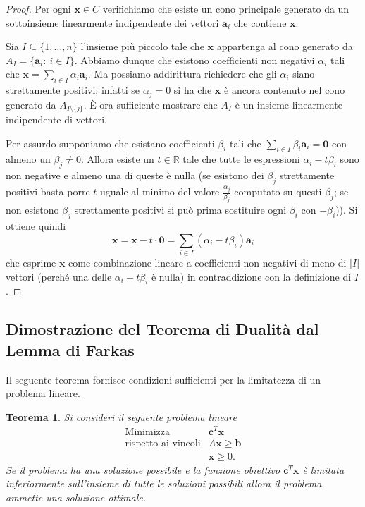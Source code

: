 \documentclass[italian, letter paper, 12pt, reqno]{article}
\theoremstyle{myteo}
\newtheorem{theorem}{Teorema}[section]
\numberwithin{equation}{section}
\begin{document}
\begin{proof}
  Per ogni \(\mathbf{x}\in C\) verifichiamo che esiste un cono principale generato da un sottoinsieme linearmente indipendente dei vettori \(\mathbf{a}_i\) che contiene \(\mathbf{x}\).

  Sia \(I\subseteq\{1,\ldots, n\}\) l'insieme più piccolo tale che \(\mathbf{x}\) appartenga al cono generato da \(A_I=\{\mathbf{a}_i\colon\ i\in I\}\).
  Abbiamo dunque che esistono coefficienti non negativi \(\alpha_i\) tali che \(\mathbf{x} = \sum_{i\in I}\alpha_i \mathbf{a}_i\).
  Ma possiamo addirittura richiedere che gli \(\alpha_i\) siano strettamente positivi; infatti se \(\alpha_j = 0\) si ha che \(\mathbf{x}\) è ancora contenuto nel cono generato da \(A_{I\setminus\{j\}}\).
  È ora sufficiente mostrare che \(A_I\) è un insieme linearmente indipendente di vettori.

  Per assurdo supponiamo che esistano coefficienti \(\beta_i\) tali che \(\sum_{i\in I}\beta_i \mathbf{a}_i=\mathbf{0}\) con almeno un \(\beta_j\neq0\).
  Allora esiste un \(t\in \mathbb{R}\) tale che tutte le espressioni \(\alpha_i - t\beta_i\) sono non negative e almeno una di queste è nulla (se esistono dei \(\beta_j\) strettamente positivi basta porre \(t\) uguale al minimo del valore \(\frac{\alpha_j}{\beta_j}\) computato su questi \(\beta_j\); se non esistono \(\beta_j\) strettamente positivi si può prima sostituire ogni \(\beta_i\) con \(-\beta_i\))).
  Si ottiene quindi  
  \begin{equation*}
    \mathbf{x} = \mathbf{x} - t\cdot\mathbf{0} = \sum_{i\in I}(\alpha_i - t\beta_i)\mathbf{a}_i
  \end{equation*}
  che esprime \(\mathbf{x}\) come combinazione lineare a coefficienti non negativi di meno di \(|I|\) vettori (perché una delle \(\alpha_i - t\beta_i\) è nulla) in contraddizione con la definizione di \(I\).
\end{proof}

\subsection{Dimostrazione del Teorema di Dualità dal Lemma di Farkas}
\label{subsec:dim_dualità}

Il seguente teorema fornisce condizioni sufficienti per la limitatezza di un problema lineare.

\begin{theorem}
  \label{teo:condizioni_sufficienti}
  Si consideri il seguente problema lineare
  \begin{equation*}
    \begin{array}{ll}
      \text{Minimizza} & \mathbf{c}^T\mathbf{x}\\
      \text{rispetto ai vincoli} & A\mathbf{x} \ge \mathbf{b}\\
                        & \mathbf{x} \ge 0.
    \end{array}
  \end{equation*}
  Se il problema ha una soluzione possibile e la funzione obiettivo \(\mathbf{c}^T\mathbf{x}\) è limitata \emph{inferiormente} sull'insieme di tutte le soluzioni possibili allora il problema ammette una soluzione ottimale.
\end{theorem}
\end{document}
